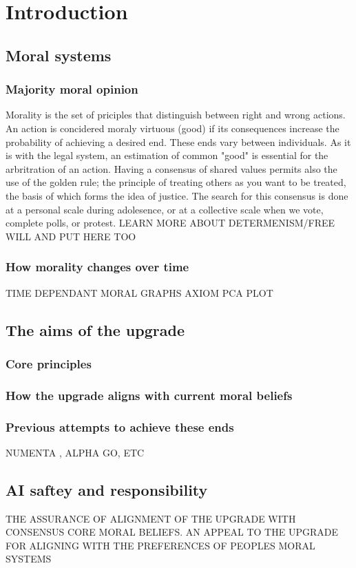 \chapter{Introduction}
\section{Moral systems}
\subsection{Majority moral opinion}
Morality is the set of priciples that distinguish between right and wrong actions. An action is concidered moraly virtuous (good) if its consequences increase the probability of achieving a desired end. These ends vary between individuals. As it is with the legal system, an estimation of common "good" is essential for the arbritration of an action. Having a consensus of shared values permits also the use of the golden rule; the principle of treating others as you want to be treated, the basis of which forms the idea of justice. The search for this consensus is done at a personal scale during adolesence, or at a collective scale when we vote, complete polls, or protest.
LEARN MORE ABOUT DETERMENISM/FREE WILL AND PUT HERE TOO

\subsection{How morality changes over time}
TIME DEPENDANT MORAL GRAPHS
AXIOM PCA PLOT

\section{The aims of the upgrade}
\subsection{Core principles}
\subsection{How the upgrade aligns with current moral beliefs}
\subsection{Previous attempts to achieve these ends}
NUMENTA \cite{numentahome}, ALPHA GO, ETC
\section{AI saftey and responsibility}
THE ASSURANCE OF ALIGNMENT OF THE UPGRADE WITH CONSENSUS CORE MORAL BELIEFS.
AN APPEAL TO THE UPGRADE FOR ALIGNING WITH THE PREFERENCES OF PEOPLES MORAL SYSTEMS
